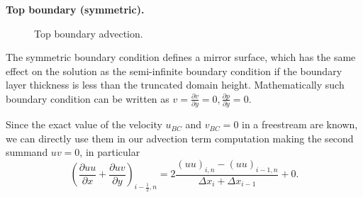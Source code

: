 \documentclass{article}
\begin{document}
\textbf{Top boundary (symmetric).}
\begin{figure}[H] %
  \caption{Top boundary advection.}\label{fig:ADV-top}
\end{figure}
The symmetric boundary condition defines a mirror surface, which has the same effect on the solution as the semi-infinite boundary condition if the boundary layer thickness is less than the truncated domain height. Mathematically such boundary condition can be written as $v=\frac{\partial v}{\partial y}=0,\frac{\partial p}{\partial y}=0$. 

Since the exact value of the velocity $u_{BC}$ and $v_{BC}=0$ in a freestream are known, we can directly use them in our advection term computation making the second summand $uv=0$, in particular
\begin{equation}
	\left( \frac{\partial uu}{\partial x}+\frac{\partial uv}{\partial y}\right)_{i-\frac{1}{2},n}=2\frac{\left( uu\right)_{i,n}-\left( uu\right)_{i-1,n}}{\Delta x_i + \Delta x_{i-1}}+0.
\end{equation}
\end{document}
